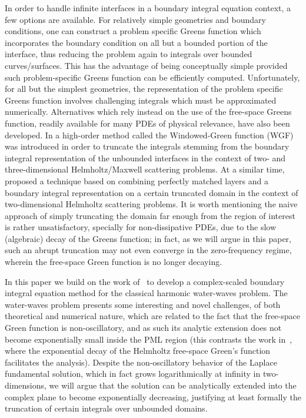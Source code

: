 \documentclass[11pt]{article}
\begin{document}
In order to handle infinite interfaces in a boundary integral equation context,
a few options are available. For relatively simple geometries and boundary
conditions, one can construct a problem specific Greens function which
incorporates the boundary condition on all but a bounded portion of the
interface, thus reducing the problem again to integrals over bounded
curves/surfaces. This has the advantage of being conceptually simple provided
such problem-specific Greens function can be efficiently computed.
Unfortunately, for all but the simplest geometries, the representation of the
problem specific Greens function involves challenging integrals which must be
approximated numerically. Alternatives which rely instead on the use of the
free-space Greens function, readily available for many PDEs of physical
relevance, have also been developed. In \cite{perez2017windowed} a high-order
method called the Windowed-Green function (WGF) was introduced in order to
truncate the integrals stemming from the boundary integral representation of the
unbounded interfaces in the context of two- and three-dimensional
Helmholtz/Maxwell scattering problems. At a similar time, \cite{lu2018perfectly}
proposed a technique based on combining perfectly matched layers and a boundary
integral representation on a certain truncated domain in the context of
two-dimensional Helmholtz scattering problems. 
It is worth mentioning the naive approach of simply truncating the domain far
enough from the region of interest is rather unsatisfactory, specially for
non-dissipative PDEs, due to the slow (algebraic) decay of the Greens function;
in fact, as we will argue in this paper, such an abrupt truncation may not even
converge in the zero-frequency regime, wherein the free-space Green function is
no longer decaying.

In this paper we build on the work of~\cite{lu2018perfectly} to develop a
complex-scaled boundary integral equation method for the classical harmonic
water-waves problem. The water-waves problem presents some interesting and novel
challenges, of both theoretical and numerical nature, which are related to the
fact that the free-space Green function is non-oscillatory, and as such its
analytic extension does not become exponentially small inside the PML region
(this contrasts the work in~\cite{lu2018perfectly}, where the exponential decay
of the Helmholtz free-space Green's function facilitates the analysis). Despite
the non-oscillatory behavior of the Laplace fundamental solution, which in fact
grows logarithmically at infinity in two-dimensions, we will argue that the
solution can be analytically extended into the complex plane to become
exponentially decreasing, justifying at least formally the truncation of certain
integrals over unbounded domains. 
\end{document}
